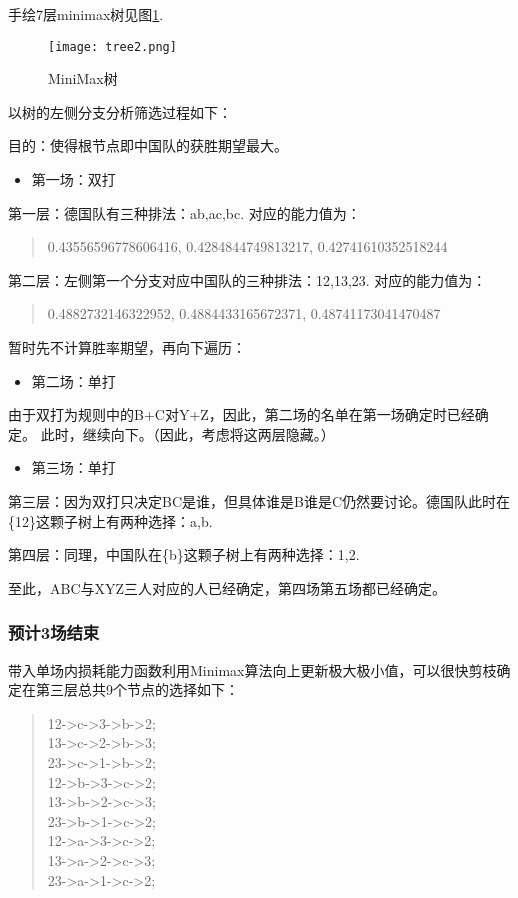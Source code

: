 \documentclass[a4paper,AutoFakeBold,AutoFakeSlant]{ctexart}
\begin{document}
手绘7层minimax树见图\ref{f6}.
\begin{figure}[htbp]
  \centering
  \texttt{[image: tree2.png]}
  \caption{MiniMax树}
  \label{f6}
\end{figure}

以树的左侧分支分析筛选过程如下：

目的：使得根节点即中国队的获胜期望最大。

\begin{itemize}
  \item 第一场：双打
\end{itemize}

第一层：德国队有三种排法：ab,ac,bc. 对应的能力值为：
\begin{quote}
  0.43556596778606416, 0.4284844749813217, 0.42741610352518244
\end{quote}

第二层：左侧第一个分支对应中国队的三种排法：12,13,23. 对应的能力值为：
\begin{quote}
  0.4882732146322952, 0.4884433165672371, 0.48741173041470487
\end{quote}

暂时先不计算胜率期望，再向下遍历：

\begin{itemize}
  \item 第二场：单打
\end{itemize}

由于双打为规则中的B+C对Y+Z，因此，第二场的名单在第一场确定时已经确定。
此时，继续向下。（因此，考虑将这两层隐藏。）

\begin{itemize}
  \item 第三场：单打
\end{itemize}

第三层：因为双打只决定BC是谁，但具体谁是B谁是C仍然要讨论。德国队此时在\{12\}这颗子树上有两种选择：a,b.

第四层：同理，中国队在\{b\}这颗子树上有两种选择：1,2.

至此，ABC与XYZ三人对应的人已经确定，第四场第五场都已经确定。

\subsubsection{预计3场结束}
带入单场内损耗能力函数利用Minimax算法向上更新极大极小值，可以很快剪枝确定在第三层总共9个节点的选择如下：
\begin{quote}
12->c->3->b->2; \\
13->c->2->b->3; \\
23->c->1->b->2; \\
12->b->3->c->2; \\
13->b->2->c->3; \\
23->b->1->c->2; \\
12->a->3->c->2; \\
13->a->2->c->3; \\
23->a->1->c->2; 
\end{quote}
\end{document}
